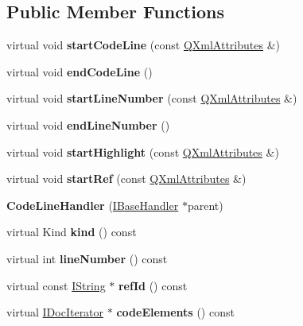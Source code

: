 \subsection*{Public Member Functions}
\begin{DoxyCompactItemize}
\item 
\mbox{\label{class_code_line_handler_a2058ba1d5e36e4c51d18769dad6a44c0}} 
virtual void {\bfseries start\+Code\+Line} (const \mbox{\hyperlink{class_q_xml_attributes}{Q\+Xml\+Attributes}} \&)
\item 
\mbox{\label{class_code_line_handler_aafc6b130565fa56b0ac71c2ad8feb078}} 
virtual void {\bfseries end\+Code\+Line} ()
\item 
\mbox{\label{class_code_line_handler_a8ec1bda327736e0bd25dbe031e3acf33}} 
virtual void {\bfseries start\+Line\+Number} (const \mbox{\hyperlink{class_q_xml_attributes}{Q\+Xml\+Attributes}} \&)
\item 
\mbox{\label{class_code_line_handler_a53c77185915b3f2a7f77cbfbaf4d4e9a}} 
virtual void {\bfseries end\+Line\+Number} ()
\item 
\mbox{\label{class_code_line_handler_a89f7af02258b7e149b0073ab078f6623}} 
virtual void {\bfseries start\+Highlight} (const \mbox{\hyperlink{class_q_xml_attributes}{Q\+Xml\+Attributes}} \&)
\item 
\mbox{\label{class_code_line_handler_ab016c28ed0bf6c0c967b371e9cd58057}} 
virtual void {\bfseries start\+Ref} (const \mbox{\hyperlink{class_q_xml_attributes}{Q\+Xml\+Attributes}} \&)
\item 
\mbox{\label{class_code_line_handler_a53b6144527ba57d79e99ee3c84044aa9}} 
{\bfseries Code\+Line\+Handler} (\mbox{\hyperlink{class_i_base_handler}{I\+Base\+Handler}} $\ast$parent)
\item 
\mbox{\label{class_code_line_handler_a961383ba55dc3b5b1369c14b4c018336}} 
virtual Kind {\bfseries kind} () const
\item 
\mbox{\label{class_code_line_handler_acff1450c9811308d2a594301c65760ec}} 
virtual int {\bfseries line\+Number} () const
\item 
\mbox{\label{class_code_line_handler_a43684a9fded12389f47fbd931286ad0c}} 
virtual const \mbox{\hyperlink{class_i_string}{I\+String}} $\ast$ {\bfseries ref\+Id} () const
\item 
\mbox{\label{class_code_line_handler_ac1eb9e2004965bed60a9ed705c9d2514}} 
virtual \mbox{\hyperlink{class_i_doc_iterator}{I\+Doc\+Iterator}} $\ast$ {\bfseries code\+Elements} () const
\end{DoxyCompactItemize}
